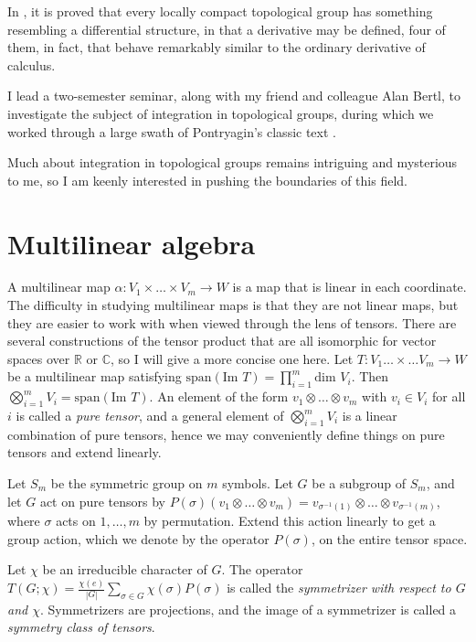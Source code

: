 \documentclass[11pt]{article}
\begin{document}
In \cite{ea96}, it is proved that every locally compact topological group
has something resembling a differential structure, in that a derivative may be
defined, four of them, in fact, that behave remarkably similar to the ordinary
derivative of calculus. 

I lead a two-semester seminar, along with my friend and colleague Alan Bertl, to
investigate the subject of integration in topological groups, during which we
worked through a large swath of Pontryagin's classic text \cite{po86}.

Much about integration in topological groups remains intriguing and mysterious
to me, so I am keenly interested in pushing the boundaries of this field.

\section{Multilinear algebra}

A multilinear map \( \alpha: V_1 \times \dots \times V_m \to W \) is a map that
is linear in each coordinate. The difficulty in studying multilinear maps is
that they are not linear maps, but they are easier to work with when viewed
through the lens of tensors. There are several constructions of the tensor
product that are all isomorphic for vector spaces over \( \mathbb{R} \) or \(
\mathbb{C} \), so I will give a more concise one here. Let \( T: V_1 \dots
\times \dots V_m \to W \) be a multilinear map satisfying \(
\text{span}(\text{Im } T) = \prod_{i=1}^m\text{dim } V_i \). Then \(
\bigotimes_{i=1}^m V_i = \text{span}(\text{Im } T) \). An element of the form \(
v_1 \otimes \dots \otimes v_m \) with \( v_i \in V_i \) for all $i$ is called a
\emph{pure tensor}, and a general element of \( \bigotimes_{i=1}^m V_i \) is a
linear combination of pure tensors, hence we may conveniently define things on
pure tensors and extend linearly.

Let \( S_m \)
be the symmetric group on $m$ symbols. Let $G$ be a subgroup of \( S_m \),
and let $G$ act on pure tensors by
\( P(\sigma)(v_1 \otimes \dots \otimes v_m) = v_{\sigma^{-1}(1)} \otimes \dots
\otimes v_{\sigma^{-1}(m)} \),
where \( \sigma \)
acts on \( 1, \dots, m \)
by permutation. Extend this action linearly to get a group action, which we
denote by the operator \( P(\sigma) \), on the entire tensor space.

Let \( \chi \) be an irreducible character of $G$. The operator \( T(G;\chi) =
\frac{\chi(e)}{|G|}\sum_{\sigma\in G}\chi(\sigma)P(\sigma) \) is called the
\emph{symmetrizer with respect to $G$ and \( \chi \)}. Symmetrizers are
projections, and the image of a symmetrizer is called a \emph{symmetry class of
tensors}.
\end{document}
